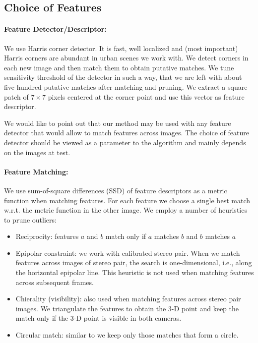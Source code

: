\documentclass[runningheads]{llncs}
\begin{document}
\subsection{Choice of Features}
\paragraph{Feature Detector/Descriptor:} We use Harris
\cite{Harris1988} corner detector. It is fast, well localized and
(most important) Harris corners are abundant in urban scenes we work
with. We detect corners in each new image and then match them to
obtain putative matches.  We tune sensitivity threshold of the
detector in such a way, that we are left with about five hundred
putative matches after matching and pruning.  We extract a square
patch of $7\times 7$ pixels centered at the corner point and use this
vector as feature descriptor.

We would like to point out that our method may be used with any
feature detector that would allow to match features across images. The
choice of feature detector should be viewed as a parameter to the
algorithm and mainly depends on the images at test.

\noindent
\paragraph{Feature Matching:} We use sum-of-square differences (SSD)
of feature descriptors as a metric function when matching
features. For each feature we choose a single best match w.r.t. the
metric function in the other image. We employ a number of heuristics
to prune outliers:
\begin{itemize}
\item Reciprocity: features $a$ and $b$ match only if $a$ matches $b$
  and $b$ matches $a$
\item Epipolar constraint: we work with calibrated stereo pair.  When
  we match features across images of stereo pair, the search is
  one-dimensional, i.e., along the horizontal epipolar line.  This
  heuristic is not used when matching features across subsequent
  frames.
\item Chierality (visibility): also used when matching features across
  stereo pair images.  We triangulate the features to obtain the 3-D
  point and keep the match only if the 3-D point is visible in both
  cameras.
\item Circular match: similar to \cite{Geiger2011} we keep only those
  matches that form a circle.
\end{itemize}
\end{document}
